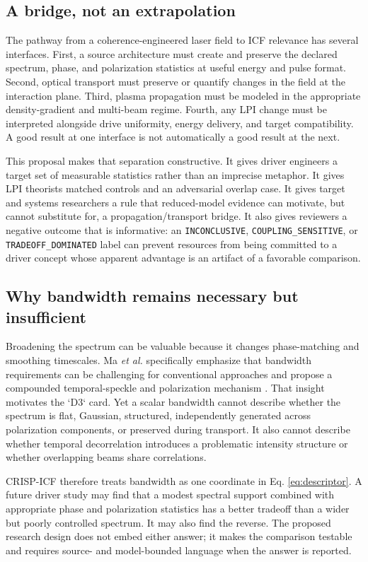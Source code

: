 \documentclass[conference]{../../../../Conference-LaTeX-template_10-17-19/IEEEtran}
\begin{document}
\subsection{A bridge, not an extrapolation}
The pathway from a coherence-engineered laser field to ICF relevance has several interfaces. First, a source architecture must create and preserve the declared spectrum, phase, and polarization statistics at useful energy and pulse format. Second, optical transport must preserve or quantify changes in the field at the interaction plane. Third, plasma propagation must be modeled in the appropriate density-gradient and multi-beam regime. Fourth, any LPI change must be interpreted alongside drive uniformity, energy delivery, and target compatibility. A good result at one interface is not automatically a good result at the next.

This proposal makes that separation constructive. It gives driver engineers a target set of measurable statistics rather than an imprecise metaphor. It gives LPI theorists matched controls and an adversarial overlap case. It gives target and systems researchers a rule that reduced-model evidence can motivate, but cannot substitute for, a propagation/transport bridge. It also gives reviewers a negative outcome that is informative: an \texttt{INCONCLUSIVE}, \texttt{COUPLING\_SENSITIVE}, or \texttt{TRADEOFF\_DOMINATED} label can prevent resources from being committed to a driver concept whose apparent advantage is an artifact of a favorable comparison.

\subsection{Why bandwidth remains necessary but insufficient}
Broadening the spectrum can be valuable because it changes phase-matching and smoothing timescales. Ma \emph{et al.} specifically emphasize that bandwidth requirements can be challenging for conventional approaches and propose a compounded temporal-speckle and polarization mechanism \cite{ma2021}. That insight motivates the `D3` card. Yet a scalar bandwidth cannot describe whether the spectrum is flat, Gaussian, structured, independently generated across polarization components, or preserved during transport. It also cannot describe whether temporal decorrelation introduces a problematic intensity structure or whether overlapping beams share correlations.

CRISP-ICF therefore treats bandwidth as one coordinate in Eq. \eqref{eq:descriptor}. A future driver study may find that a modest spectral support combined with appropriate phase and polarization statistics has a better tradeoff than a wider but poorly controlled spectrum. It may also find the reverse. The proposed research design does not embed either answer; it makes the comparison testable and requires source- and model-bounded language when the answer is reported.
\end{document}
